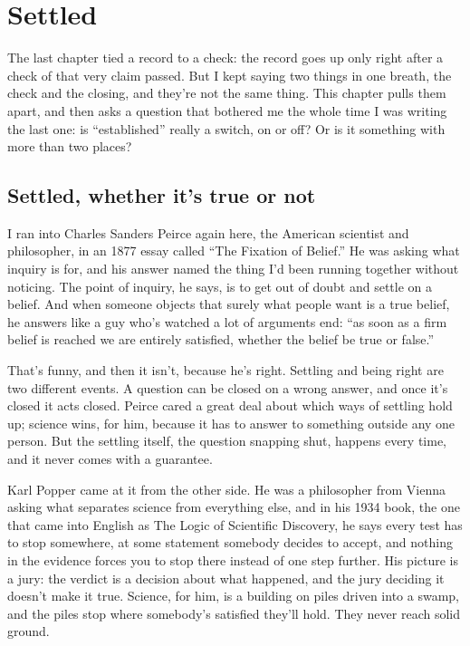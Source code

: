 \documentclass[11pt,twoside]{article}
\theoremstyle{thielethm}
\theoremstyle{thieledef}
\theoremstyle{thieledef}
\theoremstyle{thieledef}
\theoremstyle{thielethm}
\theoremstyle{thieleobs}
\theoremstyle{thielethm}
\begin{document}
\section{Settled}
\label{sec:settled}

The last chapter tied a record to a check: the record goes up only right after a check of that very claim passed. But I kept saying two things in one breath, the check and the closing, and they're not the same thing. This chapter pulls them apart, and then asks a question that bothered me the whole time I was writing the last one: is ``established'' really a switch, on or off? Or is it something with more than two places?

\subsection{Settled, whether it's true or not}

I ran into Charles Sanders Peirce again here, the American scientist and philosopher, in an 1877 essay called ``The Fixation of Belief.'' He was asking what inquiry is for, and his answer named the thing I'd been running together without noticing. The point of inquiry, he says, is to get out of doubt and settle on a belief. And when someone objects that surely what people want is a true belief, he answers like a guy who's watched a lot of arguments end: ``as soon as a firm belief is reached we are entirely satisfied, whether the belief be true or false.''

That's funny, and then it isn't, because he's right. Settling and being right are two different events. A question can be closed on a wrong answer, and once it's closed it acts closed. Peirce cared a great deal about which ways of settling hold up; science wins, for him, because it has to answer to something outside any one person. But the settling itself, the question snapping shut, happens every time, and it never comes with a guarantee.

Karl Popper came at it from the other side. He was a philosopher from Vienna asking what separates science from everything else, and in his 1934 book, the one that came into English as The Logic of Scientific Discovery, he says every test has to stop somewhere, at some statement somebody decides to accept, and nothing in the evidence forces you to stop there instead of one step further. His picture is a jury: the verdict is a decision about what happened, and the jury deciding it doesn't make it true. Science, for him, is a building on piles driven into a swamp, and the piles stop where somebody's satisfied they'll hold. They never reach solid ground.
\end{document}
